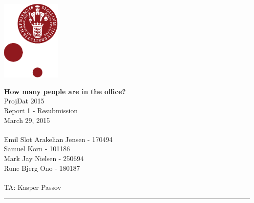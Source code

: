 \documentclass[12pt]{article}
\begin{document}
\begin{minipage}[b]{1.0\linewidth} 
\includegraphics[height=40mm]{KULogo}

\vspace*{-30ex}
\begin{center}
    {\Large \bf How many people are in the office?} \vspace*{1ex} \\
    {\large ProjDat 2015} \vspace*{1ex} \\
    {\large Report 1 - Resubmission} \vspace*{1ex} \\
    {\large March 29, 2015} \vspace*{1ex} \\
    \ \\
    
    {\large Emil Slot Arakelian Jensen - 170494} \vspace*{1ex}\\
	{\large Samuel Korn - 101186} \vspace*{1ex}\\
	{\large Mark Jay Nielsen - 250694} \vspace*{1ex}\\
	{\large Rune Bjerg Ono - 180187} \vspace*{1ex}\\
	\ \\
	
	{\large TA: Kasper Passov} \vspace*{1ex} \\
\end{center}

\vspace*{-3pt}
{\color{KU-red}\hrule}
\end{minipage}


\newpage

\tableofcontents
\end{document}
